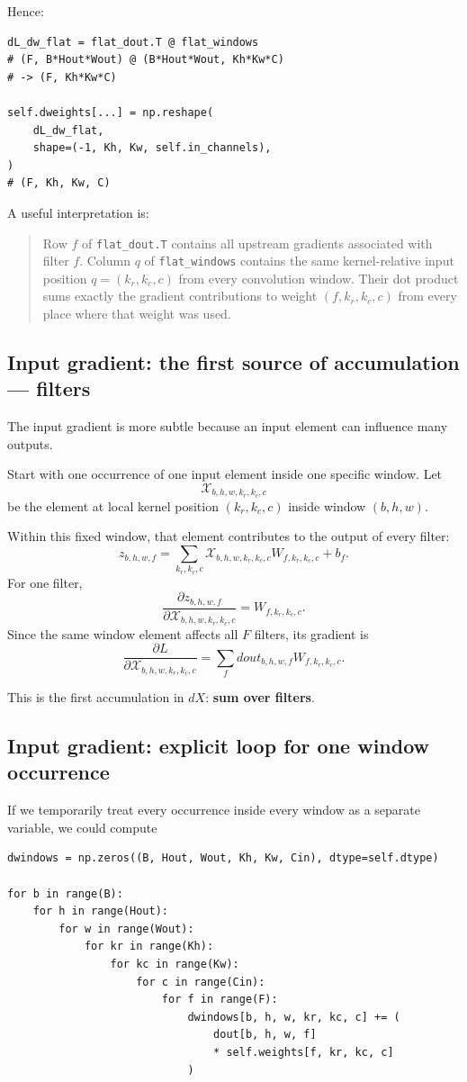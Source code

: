 \documentclass[11pt,a4paper]{article}
\newcommand{\pd}[2]{\frac{\partial #1}{\partial #2}}
\newcommand{\code}[1]{\texttt{#1}}
\begin{document}
Hence:
\begin{lstlisting}
dL_dw_flat = flat_dout.T @ flat_windows
# (F, B*Hout*Wout) @ (B*Hout*Wout, Kh*Kw*C)
# -> (F, Kh*Kw*C)

self.dweights[...] = np.reshape(
    dL_dw_flat,
    shape=(-1, Kh, Kw, self.in_channels),
)
# (F, Kh, Kw, C)
\end{lstlisting}

A useful interpretation is:
\begin{quote}
Row $f$ of \code{flat\_dout.T} contains all upstream gradients associated with filter $f$. Column $q$ of \code{flat\_windows} contains the same kernel-relative input position $q=(k_r,k_c,c)$ from every convolution window. Their dot product sums exactly the gradient contributions to weight $(f,k_r,k_c,c)$ from every place where that weight was used.
\end{quote}

\subsection{Input gradient: the first source of accumulation --- filters}

The input gradient is more subtle because an input element can influence many outputs.

Start with one occurrence of one input element inside one specific window. Let
\[
\mathcal{X}_{b,h,w,k_r,k_c,c}
\]
be the element at local kernel position $(k_r,k_c,c)$ inside window $(b,h,w)$.

Within this fixed window, that element contributes to the output of every filter:
\[
z_{b,h,w,f}
=
\sum_{k_r,k_c,c}
\mathcal{X}_{b,h,w,k_r,k_c,c}W_{f,k_r,k_c,c}+b_f.
\]
For one filter,
\[
\pd{z_{b,h,w,f}}{\mathcal{X}_{b,h,w,k_r,k_c,c}}
=W_{f,k_r,k_c,c}.
\]
Since the same window element affects all $F$ filters, its gradient is
\[
\boxed{
\pd{L}{\mathcal{X}_{b,h,w,k_r,k_c,c}}
=
\sum_f
dout_{b,h,w,f}
W_{f,k_r,k_c,c}
}.
\]

This is the first accumulation in $dX$: \textbf{sum over filters}.

\subsection{Input gradient: explicit loop for one window occurrence}

If we temporarily treat every occurrence inside every window as a separate variable, we could compute
\begin{lstlisting}
dwindows = np.zeros((B, Hout, Wout, Kh, Kw, Cin), dtype=self.dtype)

for b in range(B):
    for h in range(Hout):
        for w in range(Wout):
            for kr in range(Kh):
                for kc in range(Kw):
                    for c in range(Cin):
                        for f in range(F):
                            dwindows[b, h, w, kr, kc, c] += (
                                dout[b, h, w, f]
                                * self.weights[f, kr, kc, c]
                            )
\end{lstlisting}
\end{document}
